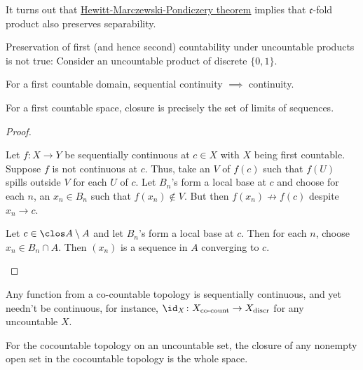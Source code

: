 	\begin{rmk}
		It turns out that \href{https://math.stackexchange.com/a/526460/673223}{Hewitt-Marczewski-Pondiczery theorem} implies that $\mathfrak c$-fold product also preserves separability.
		
		Preservation of first (and hence second) countability under uncountable products is not true: Consider an uncountable product of discrete $\{0, 1\}$.
	\end{rmk}
	
	
	\begin{prp}\label{PRP: continuity and closure in first countable}
		\leavevmode
		\begin{mylist}
			\item For a first countable domain, sequential continuity $\implies$ continuity.
			
			\item For a first countable space, closure is precisely the set of limits of sequences.
		\end{mylist}
	\end{prp}
	
	\begin{proof}
		\begin{mylist}
			\item Let $f\colon X\to Y$ be sequentially continuous at $c\in X$ with $X$ being first countable. Suppose $f$ is not continuous at $c$. Thus, take an \onbd $V$ of $f(c)$ such that $f(U)$ spills outside $V$ for each \onbd $U$ of $c$. Let $B_n$'s form a local base at $c$ and choose for each $n$,
			an $x_n\in B_n$ such that $f(x_n)\notin V$. But then $f(x_n)\not\to f(c)$ despite $x_n\to c$.
			
			\item Let $c\in\clos A\setminus A$ and let $B_n$'s form a local base at $c$. Then for each $n$, choose $x_n\in B_n\cap A$. Then $(x_n)$ is a sequence in $A$ converging to $c$.\qedhere
		\end{mylist}
	\end{proof}
	
	\begin{rmk}
		\begin{mylist}
			\item Any function from a co-countable topology is sequentially continuous, and yet needn't be continuous, for instance, $\id_X\colon X_\text{co-count}\to X_\text{discr}$ for any uncountable $X$.
			
			\item For the cocountable topology on an uncountable set, the closure of any nonempty open set in the cocountable topology is the whole space.
		\end{mylist}
	\end{rmk}
	
